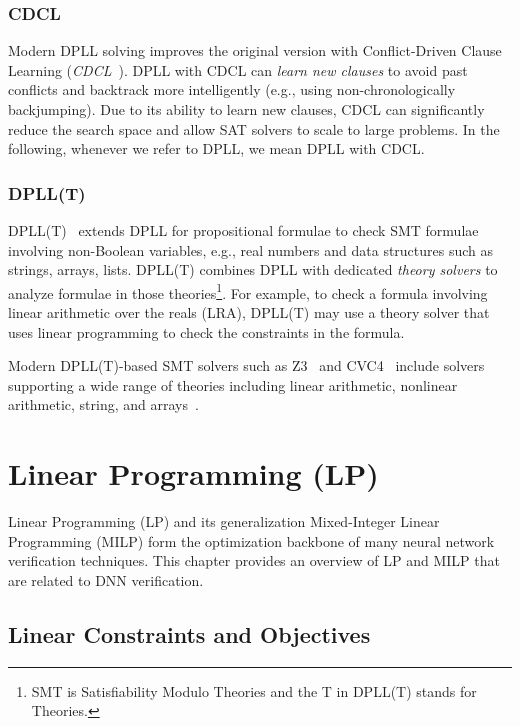 \documentclass[oneside,11pt,dvipsnames]{book}
\numberwithin{equation}{section}
\theoremstyle{definition}
\theoremstyle{remark}
\begin{document}
\subsection{CDCL} 

Modern DPLL solving improves the original version with Conflict-Driven Clause Learning (\emph{CDCL}~\cite{bayardo1997using,marques1999grasp,569607}).
DPLL with CDCL can \emph{learn new clauses} to avoid past conflicts and backtrack more intelligently (e.g., using non-chronologically backjumping).
Due to its ability to learn new clauses, CDCL can significantly  reduce the search space and allow SAT solvers to scale to large problems.
In the following, whenever we refer to DPLL, we mean DPLL with CDCL.

\subsection{DPLL(T)} 

DPLL(T)~\cite{nieuwenhuis2006solving} extends DPLL for propositional formulae to check SMT formulae involving non-Boolean variables, e.g., real numbers and data structures such as strings, arrays, lists.
DPLL(T) combines DPLL with dedicated \emph{theory solvers} to analyze formulae in those theories\footnote{SMT is Satisfiability Modulo Theories and the T in DPLL(T) stands for Theories.}.  
For example, to check a formula involving linear arithmetic over the reals (LRA), DPLL(T) may use a theory solver that uses linear programming to check the  constraints in the formula.

Modern DPLL(T)-based SMT solvers such as Z3~\cite{demoura2008z3} and CVC4~\cite{barrett2011cvc4} 
include solvers supporting a wide range of theories including linear arithmetic, nonlinear arithmetic, string, and arrays~\cite{kroening2016decision}.

\chapter{Linear Programming (LP)}\label{chap:lp}

Linear Programming (LP) and its generalization Mixed-Integer Linear Programming (MILP) 
form the optimization backbone of many neural network verification techniques.
This chapter provides an overview of LP and MILP that are related to DNN verification.


\section{Linear Constraints and Objectives}\label{sec:lp}
\end{document}
